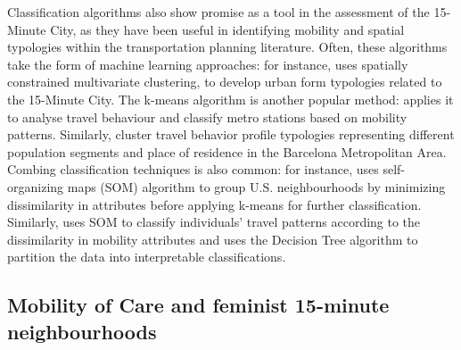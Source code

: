 \documentclass[
  authoryear,
  preprint,
  3p]{elsarticle}
\begin{document}
Classification algorithms also show promise as a tool in the assessment
of the 15-Minute City, as they have been useful in identifying mobility
and spatial typologies within the transportation planning literature.
Often, these algorithms take the form of machine learning approaches:
for instance, \citet{burkeGeospatialAnalysisFramework2022} uses
spatially constrained multivariate clustering, to develop urban form
typologies related to the 15-Minute City. The k-means algorithm is
another popular method: \citet{ganUnderstandingUrbanMobility2020}
applies it to analyse travel behaviour and classify metro stations based
on mobility patterns. Similarly,
\citep{montero2023role, montero2023applying} cluster travel behavior
profile typologies representing different population segments and place
of residence in the Barcelona Metropolitan Area. Combing classification
techniques is also common: for instance,
\citet{delmelleDifferentiatingPathwaysNeighborhood2017} uses
self-organizing maps (SOM) algorithm to group U.S. neighbourhoods by
minimizing dissimilarity in attributes before applying k-means for
further classification. Similarly, \citet{victorianoTimeSpaceMoney2020}
uses SOM to classify individuals' travel patterns according to the
dissimilarity in mobility attributes and uses the Decision Tree
algorithm to partition the data into interpretable classifications.

\subsection{Mobility of Care and feminist 15-minute
neighbourhoods}\label{mobility-of-care-and-feminist-15-minute-neighbourhoods}
\end{document}
